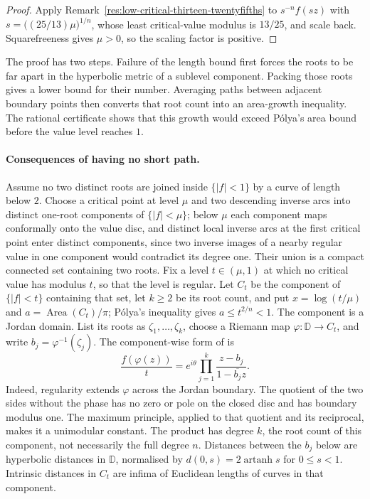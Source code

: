 \documentclass[11pt]{article}
\begin{document}
\begin{proof}
Apply Remark~\ref{res:low-critical-thirteen-twentyfifths} to
$s^{-n}f(sz)$ with $s=\bigl((25/13)\mu\bigr)^{1/n}$, whose least
critical-value modulus is $13/25$, and scale back. Squarefreeness gives
$\mu>0$, so the scaling factor is positive.
\end{proof}

The proof has two steps. Failure of the length bound first forces the
roots to be far apart in the hyperbolic metric of a sublevel component.
Packing those roots gives a lower bound for their number. Averaging paths
between adjacent boundary points then converts that root count into an
area-growth inequality. The rational certificate shows that this growth
would exceed P\'olya's area bound before the value level reaches $1$.

\paragraph{Consequences of having no short path.}
Assume no two distinct roots are joined inside $\{|f|<1\}$ by a curve of
length below $2$.  Choose a critical point at level $\mu$ and two descending
inverse arcs into distinct one-root components of $\{|f|<\mu\}$; below $\mu$
each component maps conformally onto the value disc, and distinct local
inverse arcs at the first critical point enter distinct components, since two
inverse images of a nearby regular value in one component would contradict its
degree one.  Their union is a compact connected set containing two roots.
Fix a level $t\in(\mu,1)$ at which no critical value has modulus $t$,
so that the level is regular. Let $C_t$ be the component of
$\{|f|<t\}$ containing that set, let $k\ge2$ be its root count, and put
$x=\log(t/\mu)$ and
$a=\operatorname{Area}(C_t)/\pi$; P\'olya's inequality \cite[Theorem~1]{crane}
gives $a\le t^{2/n}<1$.
The component is a Jordan domain. List its roots as
$\zeta_1,\ldots,\zeta_k$, choose a Riemann map
$\varphi:\mathbb D\to C_t$, and write $b_j=\varphi^{-1}(\zeta_j)$.
The component-wise form of \cite[(2.2)]{eks2010} is
\[
 \frac{f(\varphi(z))}{t}
 =e^{i\theta}\prod_{j=1}^k\frac{z-b_j}{1-\overline{b_j}z}.
\]
Indeed, regularity extends $\varphi$ across the Jordan boundary. The
quotient of the two sides without the phase has no zero or pole on the
closed disc and has boundary modulus one. The maximum principle,
applied to that quotient and its reciprocal, makes it a unimodular
constant. The product has degree $k$, the root count of this component,
not necessarily the full degree $n$. Distances between the $b_j$ below are
hyperbolic distances in $\mathbb D$, normalised by
$d(0,s)=2\operatorname{artanh}s$ for $0\le s<1$. Intrinsic distances
in $C_t$ are infima of Euclidean lengths of curves in that component.
\end{document}
